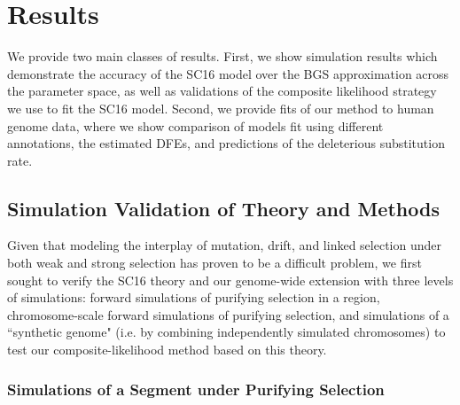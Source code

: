 \documentclass[11pt]{article}
\begin{document}
\section*{Results}

We provide two main classes of results. First, we show simulation results which demonstrate
the accuracy of the SC16 model over the BGS approximation across the parameter space,
as well as validations of the composite likelihood strategy we use to fit the SC16 model. Second, we provide fits of our method to human genome data, where we show comparison of models fit using different annotations, the estimated DFEs, and predictions of the deleterious substitution
rate.

\subsection*{Simulation Validation of Theory and Methods}

Given that modeling the interplay of mutation, drift, and linked selection under both weak and strong selection has proven to be a difficult problem, we first sought to verify the SC16 theory and our genome-wide extension with three
levels of simulations: forward simulations of purifying selection in a region,
chromosome-scale forward simulations of purifying selection, and simulations of
a ``synthetic genome" (i.e. by combining independently simulated chromosomes) to test our composite-likelihood method based on this
theory.

\subsubsection*{Simulations of a Segment under Purifying Selection}
\label{sec:segment-sims}
\end{document}
